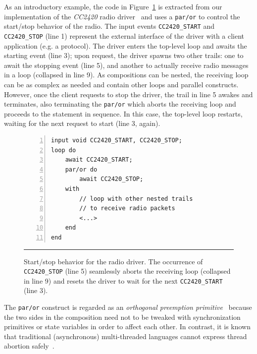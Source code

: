 \documentclass[letterpaper]{sig-alternate}
\newcommand{\code}[1] {{\small{\texttt{#1}}}}
\begin{document}
As an introductory example, the code in Figure~\ref{lst.radio} is extracted 
from our implementation of the \emph{CC2420} radio driver~\cite{wsn.teps} and 
uses a \code{par/or} to control the start/stop behavior of the radio.
The input events \code{CC2420\_START} and \code{CC2420\_STOP} (line 1) 
represent the external interface of the driver with a client application (e.g.  
a protocol).
The driver enters the top-level loop and awaits the starting event (line 3);
upon request, the driver spawns two other trails:
one to await the stopping event (line 5),
and another to actually receive radio messages in a loop (collapsed in line 9).
%
As compositions can be nested, the receiving loop can be as complex as needed 
and contain other loops and parallel constructs.
However, once the client requests to stop the driver, the trail in line 5 
awakes and terminates, also terminating the \code{par/or} which aborts the 
receiving loop and proceeds to the statement in sequence.
In this case, the top-level loop restarts, waiting for the next request to 
start (line 3, again).

\begin{figure}[t]
\begin{lstlisting}[numbers=left,xleftmargin=2.5em]
input void CC2420_START, CC2420_STOP;
loop do
    await CC2420_START;
    par/or do
        await CC2420_STOP;
    with
        // loop with other nested trails
        // to receive radio packets
        <...>
    end
end
\end{lstlisting}
\rule{8.5cm}{0.37pt}
\caption{ Start/stop behavior for the radio driver.\newline
{\small %
The occurrence of \code{CC2420\_STOP} (line 5) seamlessly aborts the receiving 
loop (collapsed in line 9) and resets the driver to wait for the next 
\code{CC2420\_START} (line 3).
}%
\label{lst.radio}
}
\end{figure}

The \code{par/or} construct is regarded as an \emph{orthogonal preemption 
primitive}~\cite{esterel.preemption} because the two sides in the composition 
need not to be tweaked with synchronization primitives or state variables in
order to affect each other.
In contrast, it is known that traditional (asynchronous) multi-threaded 
languages cannot express thread abortion 
safely~\cite{esterel.preemption,sync_async.threadsstop}.

\end{document}

